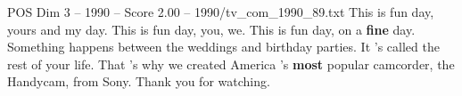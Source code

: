\begin{textsample}{POS Dim 3 – 1990 – Score 2.00 – 1990/tv\_com\_1990\_89.txt}  \label{ex:f3_pos_075}
This is fun day, yours and my day.
This is fun day, you, we.
This is fun day, on a \textbf{fine} day.
Something happens between the weddings and birthday parties.
It 's called the rest of your life.
That 's why we created America 's \textbf{most} popular camcorder, the Handycam, from Sony.
Thank you for watching.

\end{textsample}
